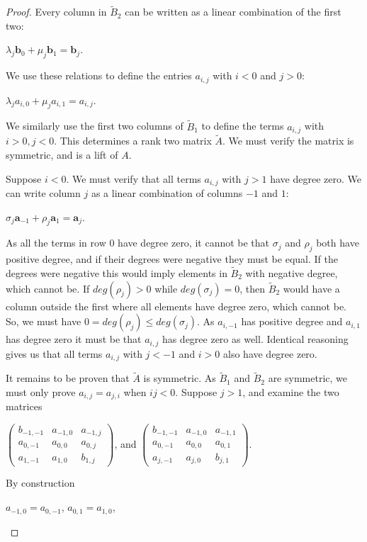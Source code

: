 \documentclass{article}
\begin{document}
\begin{proof}
  Every column in $\tilde{B}_{2}$ can be written as a linear combination of the first two: 
  \begin{center}
    $\lambda_{j} \textbf{b}_{0} + \mu_{j} \textbf{b}_{1} = \textbf{b}_{j}$.
  \end{center}
  We use these relations to define the entries $a_{i,j}$ with $i < 0$ and $j > 0$:  
  \begin{center}
    $\lambda_{j} a_{i,0} + \mu_{j} a_{i,1} = a_{i,j}$.
  \end{center}  
  We similarly use the first two columns of $\tilde{B}_{1}$ to define the terms $a_{i,j}$ with $i > 0, j < 0$. This determines a rank two matrix $\tilde{A}$. We must verify the matrix is symmetric, and is a lift of $A$.
  
  Suppose $i < 0$. We must verify that all terms $a_{i,j}$ with $j > 1$ have degree zero. We can write column $j$ as a linear combination of columns $-1$ and $1$:
  \begin{center}
    $\sigma_{j}\textbf{a}_{-1} + \rho_{j}\textbf{a}_{1} = \textbf{a}_{j}$.
  \end{center}
  As all the terms in row $0$ have degree zero, it cannot be that $\sigma_{j}$ and $\rho_{j}$ both have positive degree, and if their degrees were negative they must be equal. If the degrees were negative this would imply elements in $\tilde{B}_{2}$ with negative degree, which cannot be. If $deg(\rho_{j}) > 0$ while $deg(\sigma_{j}) = 0$, then $\tilde{B}_{2}$ would have a column outside the first where all elements have degree zero, which cannot be. So, we must have $0 = deg(\rho_{j}) \leq deg(\sigma_{j})$. As $a_{i,-1}$ has positive degree and $a_{i,1}$ has degree zero it must be that $a_{i,j}$ has degree zero as well. Identical reasoning gives us that all terms $a_{i,j}$ with $j < -1$ and $i > 0$ also have degree zero.    
  
  It remains to be proven that $\tilde{A}$ is symmetric. As $\tilde{B}_{1}$ and $\tilde{B}_{2}$ are symmetric, we must only prove $a_{i,j} = a_{j,i}$ when $ij < 0$. Suppose $j > 1$, and examine the two matrices 
  \begin{center}
    $\left(\begin{array}{ccc} b_{-1,-1} & a_{-1,0} & a_{-1,j} \\ a_{0,-1} & a_{0,0} & a_{0,j} \\ a_{1,-1} & a_{1,0} & b_{1,j} \end{array}\right)$, \hspace{.1 in} and \hspace{.1 in} $\left(\begin{array}{ccc} b_{-1,-1} & a_{-1,0} & a_{-1,1} \\ a_{0,-1} & a_{0,0} & a_{0,1} \\ a_{j,-1} & a_{j,0} & b_{j,1} \end{array}\right)$.
  \end{center}
  By construction 
  \begin{center}
    $a_{-1,0} = a_{0,-1}$, \hspace{.1 in} $a_{0,1} = a_{1,0}$, 
    

\end{center}
\end{proof}
\end{document}
